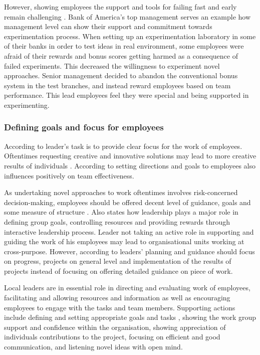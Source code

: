However, showing employees the support and tools for failing fast and early remain challenging \citep{farson2002failuretolerantleader}. Bank of America's top management serves an example how management level can show their support and commitment towards experimentation process. When setting up an experimentation laboratory in some of their banks in order to test ideas in real environment, some employees were afraid of their rewards and bonus scores getting harmed as a consequence of failed experiments. This decreased the willingness to experiment novel approaches. Senior management decided to abandon the conventional bonus system in the test branches, and instead reward employees based on team performance. This lead employees feel they were special and being supported in experimenting. \citep{thomke2003r}

\subsubsection*{Defining goals and focus for employees}
According to \citet{barczak1989leadership} leader's task is to provide clear focus for the work of employees. Oftentimes requesting creative and innovative solutions may lead to more creative results of individuals \citep{amabile2002creativity}. According to \citet{hackman1987design} setting directions and goals to employees also influences positively on team effectiveness.

As undertaking novel approaches to work oftentimes involves risk-concerned decision-making, employees should be offered decent level of guidance, goals and some measure of structure \citep{jung2003role}. Also \citet{redmond1993putting} states how leadership plays a major role in defining group goals, controlling resources and providing rewards through interactive leadership process. Leader not taking an active role in supporting and guiding the work of his employees may lead to organisational units working at cross-purpose. \citep{jung2003role} However, according to \citet{mumford2002leading} leaders' planning and guidance should focus on progress, projects on general level and implementation of the results of projects instead of focusing on offering detailed guidance on piece of work. 

Local leaders are in essential role in directing and evaluating work of employees, facilitating and allowing resources and information as well as encouraging employees to engage with the tasks and team members. \citep{amabile2004leader} Supporting actions include defining and setting appropriate goals and tasks \citet{amabile1998kill}, showing the work group support and confidence within the organisation, showing appreciation of individuals contributions to the project, focusing on efficient and good communication, and listening novel ideas with open mind. \citep{amabile2004leader} 

